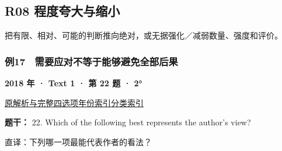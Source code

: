 \documentclass[11pt,a4paper]{article}
\begin{document}
\subsection{R08 程度夸大与缩小}
把有限、相对、可能的判断推向绝对，或无据强化／减弱数量、强度和评价。

\subsubsection{例17　需要应对不等于能够避免全部后果}\label{case-2018-T1-Q22}
\noindent\textbf{2018 年 · Text 1 · 第 22 题 · 2°}\par\noindent \href{https://zj139.github.io/math-notes/english/d6ce3eaae72046cee9e0b423/\#q22}{原解析与完整四选项}\quad \hyperref[idx-2018-T1-Q22]{年份索引}\quad \hyperref[class-R08]{分类索引}\par\smallskip
\noindent\textbf{题干：} 22. Which of the following best represents the author’s view?\par\smallskip
直译：下列哪一项最能代表作者的看法？
\end{document}

